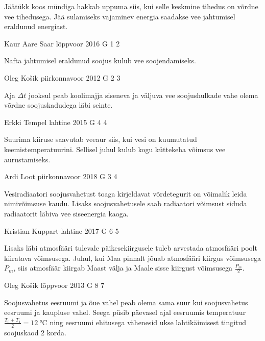 \documentclass[11pt]{article}
\begin{document}
{{\ifHint
Jäätükk koos mündiga hakkab uppuma siis, kui selle keskmine tihedus on võrdne vee tihedusega. Jää sulamiseks vajaminev energia saadakse vee jahtumisel eraldunud energiast.
\fi
}

{Kaur Aare Saar} %
{lõppvoor} %
{2016} %
{G 1} %
{2} %
{

\ifHint
Nafta jahtumisel eraldunud soojus kulub vee soojendamiseks.
\fi
}

{Oleg Košik} %
{piirkonnavoor} %
{2012} %
{G 2} %
{3} %
{

\ifHint
Aja $\Delta t$ jooksul peab koolimajja siseneva ja väljuva vee soojushulkade vahe olema võrdne soojuskadudega läbi seinte.
\fi
}

{Erkki Tempel} %
{lahtine} %
{2015} %
{G 4} %
{4} %
{

\ifHint
Suurima kiiruse saavutab veeaur siis, kui vesi on kuumutatud keemistemperatuurini. Sellisel juhul kulub kogu küttekeha võimsus vee aurustamiseks.
\fi
}

{Ardi Loot} %
{piirkonnavoor} %
{2018} %
{G 3} %
{4} %
{

\ifHint
Vesiradiaatori soojusvahetust toaga kirjeldavat võrdetegurit on võimalik leida nimivõimsuse kaudu. Lisaks soojusvahetusele saab radiaatori võimsust siduda radiaatorit läbiva vee siseenergia kaoga.
\fi
}

{Kristian Kuppart} %
{lahtine} %
{2017} %
{G 6} %
{5} %
{

\ifHint
Lisaks läbi atmosfääri tulevale päikesekiirgusele tuleb arvestada atmosfääri poolt kiiratava võimsusega. Juhul, kui Maa pinnalt jõuab atmosfääri kiirgus võimsusega $P_m$, siis atmosfäär kiirgab Maast välja ja Maale sisse kiirgust võimsusega $\frac{P_m}{2}$.
\fi
}

{Oleg Košik} %
{lõppvoor} %
{2013} %
{G 8} %
{7} %
{

\ifHint
Soojusvahetus eesruumi ja õue vahel peab olema sama suur kui soojusvahetus eesruumi ja kaupluse vahel. Seega püsib päevasel ajal eesruumis temperatuur $\frac{T_0+T_1}{2}=\SI{12}{\celsius}$ ning eesruumi ehitusega vähenesid ukse lahtikäimisest tingitud soojuskaod 2 korda.
\fi
}

}
\end{document}
